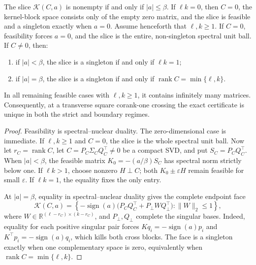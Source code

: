 \begin{theorem}
\label{thm:certificate-uniqueness}
The slice \(\mathcal K(C,a)\) is nonempty if and only if \(|a|\le\beta\).
If \(\ell k=0\), then \(C=0\), the kernel-block space consists only of the
empty zero matrix, and the slice is feasible and a singleton exactly when
\(a=0\).  Assume henceforth that \(\ell,k\ge1\).  If \(C=0\), feasibility
forces \(a=0\), and the slice is the entire, non-singleton spectral unit ball.
If \(C\ne0\), then:
\begin{enumerate}
 \item if \(|a|<\beta\), the slice is a singleton if and only if
 \(\ell k=1\);
 \item if \(|a|=\beta\), the slice is a singleton if and only if
 \(\operatorname{rank}C=\min\{\ell,k\}\).
\end{enumerate}
In all remaining feasible cases with \(\ell,k\ge1\), it contains infinitely
many matrices.
Consequently, at a transverse square corank-one crossing the exact certificate
is unique in both the strict and boundary regimes.
\end{theorem}

\begin{proof}
Feasibility is spectral--nuclear duality.  The zero-dimensional case is
immediate.  If \(\ell,k\ge1\) and \(C=0\), the slice is the whole spectral
unit ball.  Now let
\(r_C=\operatorname{rank}C\), let
\(C=P_C\Sigma_C Q_C^\top\ne0\) be a compact SVD, and put
\(S_C=P_CQ_C^\top\).  When
\(|a|<\beta\), the feasible matrix
\(K_0=-(a/\beta)S_C\) has spectral norm strictly below one.  If \(\ell k>1\),
choose nonzero \(H\perp C\); both \(K_0\pm\varepsilon H\) remain feasible for
small \(\varepsilon\).  If \(\ell k=1\), the equality fixes the only entry.

At \(|a|=\beta\), equality in spectral--nuclear duality gives the complete
endpoint face
\begin{equation}
 \mathcal K(C,a)=
 \left\{-\operatorname{sign}(a)
 \bigl(P_CQ_C^\top+P_\perp WQ_\perp^\top\bigr):\|W\|_2\le1\right\},
 \label{eq:endpoint-face}
\end{equation}
where \(W\in\mathbb R^{(\ell-r_C)\times(k-r_C)}\), and
\(P_\perp,Q_\perp\) complete the singular bases.  Indeed, equality for each
positive singular pair forces
\(Kq_i=-\operatorname{sign}(a)p_i\) and
\(K^\top p_i=-\operatorname{sign}(a)q_i\), which kills both cross blocks.  The face
is a singleton exactly when one complementary space is zero, equivalently
when \(\operatorname{rank}C=\min\{\ell,k\}\).
\end{proof}

